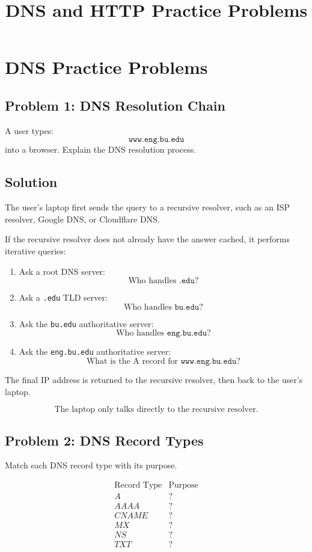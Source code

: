 \documentclass[12pt]{article}
\title{DNS and HTTP Practice Problems}
\author{}
\date{}
\begin{document}
\maketitle

\section*{DNS Practice Problems}

\subsection*{Problem 1: DNS Resolution Chain}
A user types:
\[
\texttt{www.eng.bu.edu}
\]
into a browser. Explain the DNS resolution process.

\subsection*{Solution}
The user's laptop first sends the query to a recursive resolver, such as an ISP resolver, Google DNS, or Cloudflare DNS.

If the recursive resolver does not already have the answer cached, it performs iterative queries:

\begin{enumerate}
    \item Ask a root DNS server:
    \[
    \text{Who handles } \texttt{.edu}?
    \]
    \item Ask a \texttt{.edu} TLD server:
    \[
    \text{Who handles } \texttt{bu.edu}?
    \]
    \item Ask the \texttt{bu.edu} authoritative server:
    \[
    \text{Who handles } \texttt{eng.bu.edu}?
    \]
    \item Ask the \texttt{eng.bu.edu} authoritative server:
    \[
    \text{What is the A record for } \texttt{www.eng.bu.edu}?
    \]
\end{enumerate}

The final IP address is returned to the recursive resolver, then back to the user's laptop.

\[
\boxed{\text{The laptop only talks directly to the recursive resolver.}}
\]

\subsection*{Problem 2: DNS Record Types}
Match each DNS record type with its purpose.

\[
\begin{array}{c|c}
\text{Record Type} & \text{Purpose} \\
\hline
A & ? \\
AAAA & ? \\
CNAME & ? \\
MX & ? \\
NS & ? \\
TXT & ?
\end{array}
\]
\end{document}
